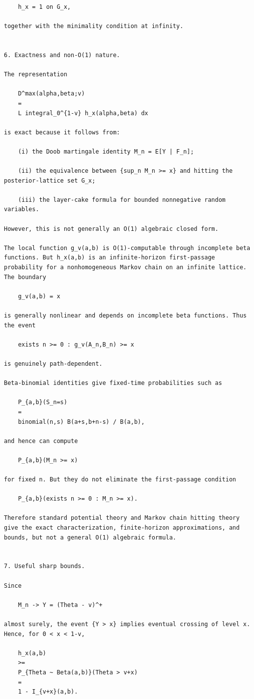 \begin{small}
\begin{verbatim}
    h_x = 1 on G_x,

together with the minimality condition at infinity.


6. Exactness and non-O(1) nature.

The representation

    D^max(alpha,beta;v)
    =
    L integral_0^{1-v} h_x(alpha,beta) dx

is exact because it follows from:

    (i) the Doob martingale identity M_n = E[Y | F_n];

    (ii) the equivalence between {sup_n M_n >= x} and hitting the posterior-lattice set G_x;

    (iii) the layer-cake formula for bounded nonnegative random variables.

However, this is not generally an O(1) algebraic closed form.

The local function g_v(a,b) is O(1)-computable through incomplete beta functions. But h_x(a,b) is an infinite-horizon first-passage probability for a nonhomogeneous Markov chain on an infinite lattice. The boundary

    g_v(a,b) = x

is generally nonlinear and depends on incomplete beta functions. Thus the event

    exists n >= 0 : g_v(A_n,B_n) >= x

is genuinely path-dependent.

Beta-binomial identities give fixed-time probabilities such as

    P_{a,b}(S_n=s)
    =
    binomial(n,s) B(a+s,b+n-s) / B(a,b),

and hence can compute

    P_{a,b}(M_n >= x)

for fixed n. But they do not eliminate the first-passage condition

    P_{a,b}(exists n >= 0 : M_n >= x).

Therefore standard potential theory and Markov chain hitting theory give the exact characterization, finite-horizon approximations, and bounds, but not a general O(1) algebraic formula.


7. Useful sharp bounds.

Since

    M_n -> Y = (Theta - v)^+

almost surely, the event {Y > x} implies eventual crossing of level x. Hence, for 0 < x < 1-v,

    h_x(a,b)
    >=
    P_{Theta ~ Beta(a,b)}(Theta > v+x)
    =
    1 - I_{v+x}(a,b).


\end{verbatim}
\end{small}
